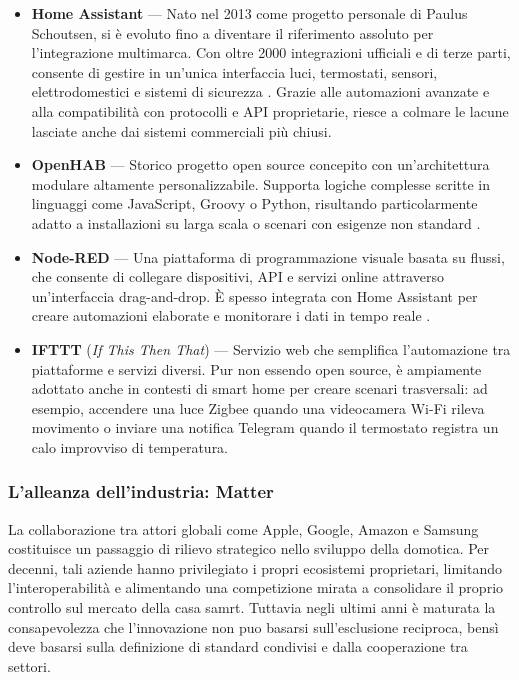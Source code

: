 \begin{itemize}
\item \textbf{Home Assistant} — Nato nel 2013 come progetto personale di Paulus Schoutsen, si è evoluto fino a diventare il riferimento assoluto per l’integrazione multimarca. Con oltre 2000 integrazioni ufficiali e di terze parti, consente di gestire in un’unica interfaccia luci, termostati, sensori, elettrodomestici e sistemi di sicurezza \cite{HomeAssistant2024}. Grazie alle automazioni avanzate e alla compatibilità con protocolli e API proprietarie, riesce a colmare le lacune lasciate anche dai sistemi commerciali più chiusi.
\item \textbf{OpenHAB} — Storico progetto open source concepito con un’architettura modulare altamente personalizzabile. Supporta logiche complesse scritte in linguaggi come JavaScript, Groovy o Python, risultando particolarmente adatto a installazioni su larga scala o scenari con esigenze non standard \cite{OpenHAB2023}.  

\item \textbf{Node-RED} — Una piattaforma di programmazione visuale basata su flussi, che consente di collegare dispositivi, API e servizi online attraverso un’interfaccia drag-and-drop. È spesso integrata con Home Assistant per creare automazioni elaborate e monitorare i dati in tempo reale \cite{NodeRED2024}.  

\item \textbf{IFTTT} (\emph{If This Then That}) — Servizio web che semplifica l’automazione tra piattaforme e servizi diversi. Pur non essendo open source, è ampiamente adottato anche in contesti di smart home per creare scenari trasversali: ad esempio, accendere una luce Zigbee quando una videocamera Wi-Fi rileva movimento o inviare una notifica Telegram quando il termostato registra un calo improvviso di temperatura.
\end{itemize}

\subsubsection{L'alleanza dell'industria: Matter}

La collaborazione tra attori globali come Apple, Google, Amazon e Samsung costituisce un passaggio di rilievo strategico nello sviluppo della domotica. Per decenni, tali aziende hanno privilegiato i propri ecosistemi proprietari, limitando l’interoperabilità e alimentando una competizione mirata a consolidare il proprio controllo sul mercato della casa samrt. Tuttavia negli ultimi anni è maturata la consapevolezza che l’innovazione non puo basarsi sull’esclusione reciproca, bensì deve basarsi sulla definizione di standard condivisi e dalla cooperazione tra settori.

